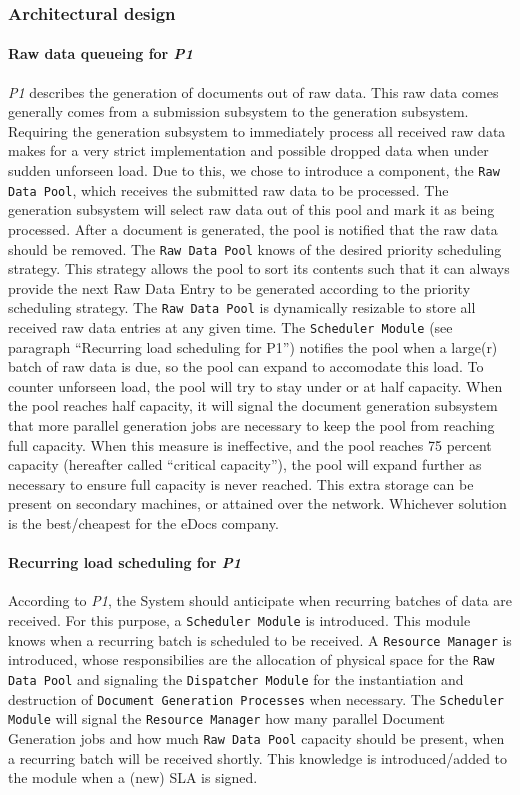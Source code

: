 \documentclass[a4paper,10pt]{article}
\begin{document}
\subsubsection{Architectural design}
\paragraph{Raw data queueing for \emph{P1}}
\emph{P1} describes the generation of documents out of raw data. This raw data comes generally comes from a submission subsystem to the generation subsystem. Requiring the generation subsystem to immediately process all received raw data makes for a very strict implementation and possible dropped data when under sudden unforseen load. Due to this, we chose to introduce a component, the \texttt{Raw Data Pool}, which receives the submitted raw data to be processed. The generation subsystem will select raw data out of this pool and mark it as being processed. After a document is generated, the pool is notified that the raw data should be removed. The \texttt{Raw Data Pool} knows of the desired priority scheduling strategy. This strategy allows the pool to sort its contents such that it can always provide the next Raw Data Entry to be generated according to the priority scheduling strategy. The \texttt{Raw Data Pool} is dynamically resizable to store all received raw data entries at any given time. The \texttt{Scheduler Module} (see paragraph ``Recurring load scheduling for P1'') notifies the pool when a large(r) batch of raw data is due, so the pool can expand to accomodate this load. To counter unforseen load, the pool will try to stay under or at half capacity.  When the pool reaches half capacity, it will signal the document generation subsystem that more parallel generation jobs are necessary to keep the pool from reaching full capacity. When this measure is ineffective, and the pool reaches 75 percent capacity (hereafter called ``critical capacity''), the pool will expand further as necessary to ensure full capacity is never reached. This extra storage can be present on secondary machines, or attained over the network. Whichever solution is the best/cheapest for the eDocs company.

\paragraph{Recurring load scheduling for \emph{P1}}
According to \emph{P1}, the System should anticipate when recurring batches of data are received. For this purpose, a \texttt{Scheduler Module} is introduced. This module knows when a recurring batch is scheduled to be received. A \texttt{Resource Manager} is introduced, whose responsibilies are the allocation of physical space for the \texttt{Raw Data Pool} and signaling the \texttt{Dispatcher Module} for the instantiation and destruction of \texttt{Document Generation Processes} when necessary. The \texttt{Scheduler Module} will signal the \texttt{Resource Manager} how many parallel Document Generation jobs and how much \texttt{Raw Data Pool} capacity should be present, when a recurring batch will be received shortly. This knowledge is introduced/added to the module when a (new) SLA is signed.
\end{document}
